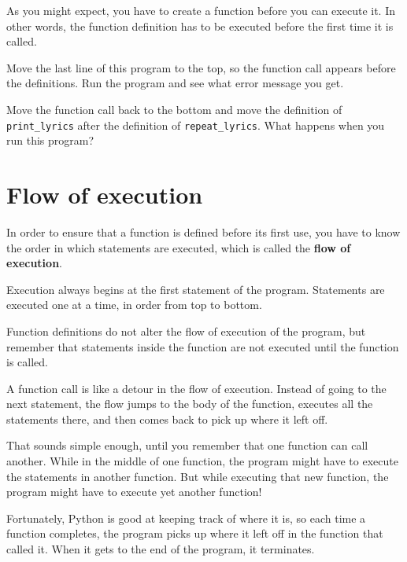 \documentclass[10pt]{book}
\begin{document}

As you might expect, you have to create a function before you can
execute it.  In other words, the function definition has to be
executed before the first time it is called.

\begin{ex}
Move the last line of this program
to the top, so the function call appears before the definitions. Run 
the program and see what error
message you get.
\end{ex}

\begin{ex}
Move the function call back to the bottom
and move the definition of \verb"print_lyrics" after the definition of
\verb"repeat_lyrics".  What happens when you run this program?
\end{ex}


\section{Flow of execution}

In order to ensure that a function is defined before its first use,
you have to know the order in which statements are executed, which is
called the {\bf flow of execution}.

Execution always begins at the first statement of the program.
Statements are executed one at a time, in order from top to bottom.

Function definitions do not alter the flow of execution of the
program, but remember that statements inside the function are not
executed until the function is called.

A function call is like a detour in the flow of execution. Instead of
going to the next statement, the flow jumps to the body of
the function, executes all the statements there, and then comes back
to pick up where it left off.

That sounds simple enough, until you remember that one function can
call another.  While in the middle of one function, the program might
have to execute the statements in another function. But while
executing that new function, the program might have to execute yet
another function!

Fortunately, Python is good at keeping track of where it is, so each
time a function completes, the program picks up where it left off in
the function that called it.  When it gets to the end of the program,
it terminates.
\end{document}
